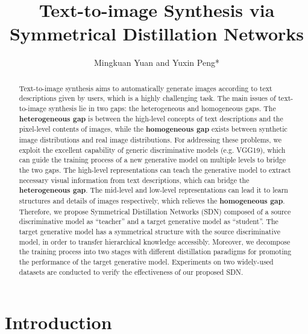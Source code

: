 \documentclass[sigconf]{acmart}
\begin{document}
\title{Text-to-image Synthesis via Symmetrical Distillation Networks}

\author{Mingkuan Yuan and Yuxin Peng*}


\begin{abstract}
Text-to-image synthesis aims to automatically generate images according to text descriptions given by users, which is a highly challenging task. The main issues of text-to-image synthesis lie in two gaps: the heterogeneous and homogeneous gaps. The \textbf{heterogeneous gap} is between the high-level concepts of text descriptions and the pixel-level contents of images, while the \textbf{homogeneous gap} exists between synthetic image distributions and real image distributions. For addressing these problems, we exploit the excellent capability of generic discriminative models (e.g. VGG19), which can guide the training process of a new generative model on multiple levels to bridge the two gaps. The high-level representations can teach the generative model to extract necessary visual information from text descriptions, which can bridge the \textbf{heterogeneous gap}. The mid-level and low-level representations can lead it to learn structures and details of images respectively, which relieves the \textbf{homogeneous gap}. Therefore, we propose Symmetrical Distillation Networks (SDN) composed of a source discriminative model as ``teacher'' and a target generative model as ``student''. The target generative model has a symmetrical structure with the source discriminative model, in order to transfer hierarchical knowledge accessibly. Moreover, we decompose the training process into two stages with different distillation paradigms for promoting the performance of the target generative model. Experiments on two widely-used datasets are conducted to verify the effectiveness of our proposed SDN.
\end{abstract}

\maketitle



\section{Introduction}
\end{document}
